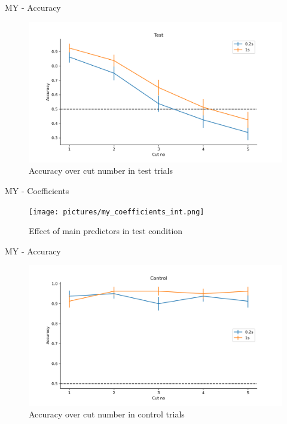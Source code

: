 \documentclass[10pt,xcolor=svgnames]{beamer} %
\begin{document}
\begin{frame}{MY - Accuracy}
    \begin{figure}
        \hspace*{-1cm} 
        \centering
        \includegraphics[width = 1.2\textwidth]{pictures/my_test.png}
        \caption{Accuracy over cut number in test trials}
        \label{fig:my_test}
    \end{figure}    
\end{frame}

\begin{frame}{MY - Coefficients}
    \begin{figure}
        \hspace*{-1cm} 
        \centering
        \texttt{[image: pictures/my\_coefficients\_int.png]}
        \caption{Effect of main predictors in test condition}
        \label{fig:my_cont_coeffs}
    \end{figure}    
\end{frame}

\begin{frame}{MY - Accuracy}
    \begin{figure}
        \hspace*{-1cm} 
        \centering
        \includegraphics[width = 1.1\textwidth]{pictures/my_control.png}
        \caption{Accuracy over cut number in control trials}
        \label{fig:my_cont}
    \end{figure}    
\end{frame}
\end{document}
